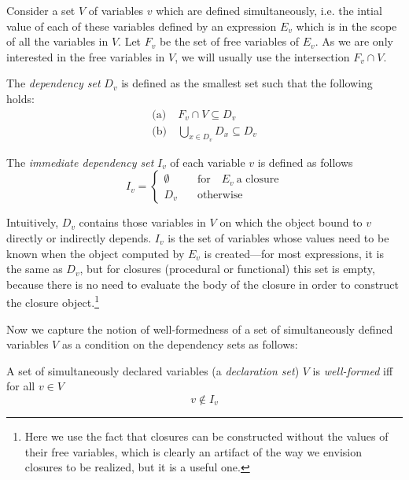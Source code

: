 \begin{defn}\label{def:DependencySets}
  Consider a set $V$ of variables $v$ which are defined
  simultaneously, i.e. the intial value of each of these variables
  defined by an expression $E_v$ which is in the scope of all the
  variables in $V$. Let $F_v$ be the set of free variables of
  $E_v$. As we are only interested in the free variables in $V$, we
  will usually use the intersection $F_v \cap V$. 
  
  The {\em dependency set} $D_v$ is defined as the smallest set
  such that the following holds:
\begin{eqnarray*}
\text{(a)}~&F_v \cap V \subseteq D_v \\
\text{(b)}~&\underset{x \in D_v}\bigcup D_x \subseteq D_v
\end{eqnarray*}

The
  {\em immediate dependency set} $I_v$ of each variable $v$ is defined
  as follows
\[I_v = \begin{cases}
  \emptyset \quad &\text{for} \quad E_v ~ \text{a closure}\\
  D_v \quad &\text{otherwise}
\end{cases}\]
\end{defn}

Intuitively, $D_v$ contains those variables in $V$ on which the object
bound to $v$ directly or indirectly depends. $I_v$ is the set of
variables whose values need to be known when the object computed by
$E_v$ is created---for most expressions, it is the same as $D_v$, but
for closures (procedural or functional) this set is empty, because
there is no need to evaluate the body of the closure in order to
construct the closure object.\footnote{Here we use the fact that
  closures can be constructed without the values of their free
  variables, which is clearly an artifact of the way we envision
  closures to be realized, but it is a useful one.}

Now we capture the notion of well-formedness of a set of
simultaneously defined variables $V$ as a condition on the dependency
sets as follows:

\begin{defn}
A set of simultaneously declared variables (a {\em declaration set}) $V$ is {\em well-formed} iff
for all $v\in V$
$$v \notin I_v$$
\end{defn}

